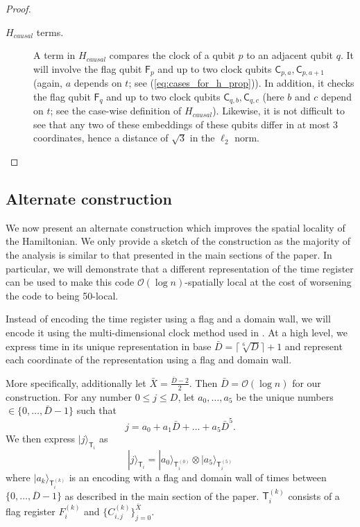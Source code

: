 \documentclass[11pt,letterpaper]{article}
\theoremstyle{definition}
\theoremstyle{remark}
\renewcommand{\leq}{\leqslant}
\numberwithin{equation}{section}
\theoremstyle{definition}
\newcommand{\ket}[1]{|#1\rangle}
\newcommand{\sC}{{\mathsf{C}}}
\newcommand{\sF}{{\mathsf{F}}}
\newcommand{\sT}{{\mathsf{T}}}
\begin{document}
\begin{proof}
\begin{description}
\item[$H_{causal}$ terms.] A term in $H_{causal}$ compares the clock of a qubit $p$ to an adjacent qubit $q$. It will involve the flag qubit $\sF_p$ and up to two clock qubits $\sC_{p,a}, \sC_{p,a+1}$ (again, $a$ depends on $t$; see (\ref{eq:cases_for_h_prop})). In addition, it checks the flag qubit $\sF_q$ and up to two clock qubits $\sC_{q,b}, \sC_{q,c}$ (here $b$ and $c$ depend on $t$; see the case-wise definition of $H_{causal}$). Likewise, it is not difficult to see that any two of these embeddings of these qubits differ in at most 3 coordinates, hence a distance of $\sqrt{3}$ in the $\ell_2$ norm.
\end{description}
\end{proof}

\subsection{Alternate construction}

We now present an alternate construction which improves the spatial locality of the Hamiltonian. We only provide a sketch of the construction as the majority of the analysis is similar to that presented in the main sections of the paper. In particular, we will demonstrate that a different representation of the time register can be used to make this code $\mathcal{O}(\log n)$-spatially local at the cost of worsening the code to being 50-local.

Instead of encoding the time register using a flag and a domain wall, we will encode it using the multi-dimensional clock method used in \cite{nirkhe_et_al:LIPIcs:2018:9095}. At a high level, we express time in its unique representation in base $\bar{D} = \lceil \sqrt[6]{D} \rceil + 1$ and represent each coordinate of the representation using a flag and domain wall.

More specifically, additionally let $\bar{X} = \frac{\bar{D} - 2}{2}$. Then $\bar{D} = \mathcal{O}(\log n)$ for our construction. For any number $0 \leq j \leq D$, let $a_0, \ldots, a_5$ be the unique numbers $\in \{0, \ldots, \bar{D} - 1\}$ such that
\begin{equation}
j = a_0 + a_1 \bar{D} + \ldots + a_5 \bar{D}^5.
\end{equation}
We then express $\ket{j}_{\sT_i}$ as
\begin{equation}
\ket{j}_{\sT_i} = \ket{a_0}_{\sT_i^{(0)}} \otimes \ket{a_5}_{\sT_i^{(5)}}
\end{equation}
where $\ket{a_k}_{\sT_i^(k)}$ is an encoding with a flag and domain wall of times between $\{0, \ldots, \overline{D} - 1\}$ as described in the main section of the paper. $\sT_i^{(k)}$ consists of a flag register $F_i^{(k)}$ and $\{ C_{i,j}^{(k)}\}_{j = 0}^{\bar X}$.
\end{document}
